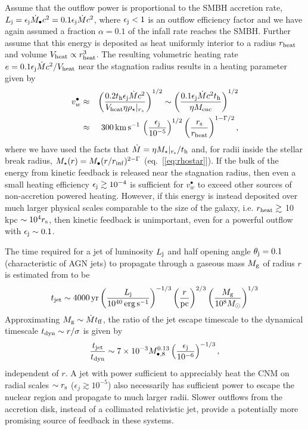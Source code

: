 \documentclass[usenatbib,fleqn]{mn2e}
\begin{document}
Assume that the outflow power is proportional to the SMBH accretion
rate, $L_{\rm j} = \epsilon_{\rm j} \dot{M}_{\bullet}c^{2} = 0.1\epsilon_{\rm j} \dot{M}c^{2} $, where
$\epsilon_{\rm j} < 1$ is an outflow efficiency factor and we have again assumed a fraction $\alpha = 0.1$ of the infall rate reaches the SMBH.  Further assume
that this energy is deposited as heat uniformly interior to a radius
$r_{\rm heat}$ and volume $V_{\rm heat} \propto r_{\rm heat}^{3}$.
The resulting volumetric heating rate $e = 0.1\epsilon_{\rm
  j}\dot{M}c^{2}/V_{\rm heat}$ near the stagnation radius results in a
heating parameter given by
\begin{eqnarray} v_{w}^{\bullet} &\approx& \left(\frac{0.2t_{\rm
        h}\epsilon_{\rm j}\dot{M}c^{2}}{V_{\rm heat}\eta
      \rho_{\star}|_{r_{s}}}\right)^{1/2} \sim
  \left(\frac{0.1\epsilon_{\rm
        j}\dot{M}c^{2}t_{\rm h}}{\eta M_{\rm enc}}\right)^{1/2} \nonumber \\
  &\approx& 300\,{\rm km\,s^{-1}}\,\left(\frac{\epsilon_{\rm
        j}}{10^{-5}}\right)^{1/2}\left(\frac{r_{\rm s}}{r_{\rm
        heat}}\right)^{1-\Gamma/2},
\label{eq:vjet}
\end{eqnarray} 
where we have used the facts that $\dot{M} = \eta M_{\star}|_{r_{\rm
    s}}/t_{\rm h}$ and, for radii inside the stellar break radius,
$M_{\star}(r) = M_{\bullet}(r/r_{\rm inf})^{2-\Gamma}$
(eq.~[\ref{eq:rhostar}]).  If the bulk of the energy from kinetic
feedback is released near the stagnation radius, then even a small
heating efficiency $\epsilon_{\rm j} \gtrsim 10^{-4}$ is sufficient
for $v_{w}^{\bullet}$ to exceed other sources of non-accretion powered
heating.  However, if this energy is instead deposited over much
larger physical scales comparable to the size of the galaxy,
i.e. $r_{\rm heat} \gtrsim $ 10 kpc $\sim 10^{4}r_{\rm s}$, then
kinetic feedback is unimportant, even for a powerful outflow with
$\epsilon_{\rm j} \sim 0.1$.

The time required for a jet of luminosity $L_{\rm
  j}$ and half opening angle $\theta_{\rm j} = 0.1$ (characteristic of
AGN jets) to propagate through a gaseous mass $M_{\rm g}$ of radius $r$ is estimated from \citet{Bromberg+11} to be 
\begin{eqnarray}
  t_{\rm jet} \sim 4000\,{\rm yr}\left(\frac{{L}_{\rm j}}{10^{40}\,\rm erg\,s^{-1}}\right)^{-1/3}\left(\frac{r}{\rm pc}\right)^{2/3}\left(\frac{M_{\rm g}}{10^{8}M_{\odot}}\right)^{1/3} 
\end{eqnarray}
Approximating $M_{\rm g} \sim \dot{M}t_{\rm ff}$, the ratio of the jet
escape timescale to the dynamical timescale $t_{\rm dyn} \sim
r/\sigma$ is given by
\begin{equation}
  \frac{t_{\rm jet}}{t_{\rm dyn}} \sim 7\times 10^{-3}M_{\bullet,8}^{0.13}\left(\frac{\epsilon_{\rm j}}{10^{-6}}\right)^{-1/3},
\end{equation}
independent of $r$.  A jet with power sufficient to appreciably heat
the CNM on radial scales $\sim r_{\rm s}$ ($\epsilon_{j} \gtrsim
10^{-5}$) also necessarily has sufficient power to escape the nuclear
region and propagate to much larger radii.  Slower outflows from the
accretion disk, instead of a collimated relativistic jet, provide
a potentially more promising source of feedback in these systems.
\end{document}
